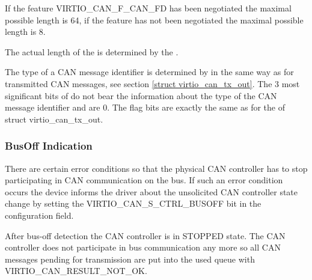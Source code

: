If the feature VIRTIO_CAN_F_CAN_FD has been negotiated the maximal
possible  length is 64, if the feature has not been
negotiated the maximal possible  length is 8.

The actual length of the  is determined by the .

The type of a CAN message identifier is determined by  in
the same way as for transmitted CAN messages, see section \ref{struct
virtio_can_tx_out}. The 3 most significant bits of  do not
bear the information about the type of the CAN message identifier and
are 0. The flag bits are exactly the same as for the  of
struct virtio_can_tx_out.

\subsubsection{BusOff Indication}\label{sec:Device Types / CAN Device / Device Operation / BusOff Indication}

There are certain error conditions so that the physical CAN controller
has to stop participating in CAN communication on the bus. If such an
error condition occurs the device informs the driver about the
unsolicited CAN controller state change by setting the
VIRTIO_CAN_S_CTRL_BUSOFF bit in the configuration  field.

After bus-off detection the CAN controller is in STOPPED state. The CAN
controller does not participate in bus communication any more so all CAN
messages pending for transmission are put into the used queue with
 VIRTIO_CAN_RESULT_NOT_OK.
